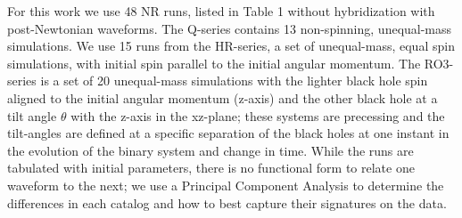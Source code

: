 \documentclass[%
 reprint,
 amsmath,amssymb,
 aps,
]{revtex4-1}
\begin{document}
For this work we use 48 NR runs, listed in Table 1 without hybridization with post-Newtonian waveforms. The Q-series contains 13 non-spinning, unequal-mass simulations. We use 15 runs from the HR-series, a set of unequal-mass, equal spin simulations, with initial spin parallel to the initial angular momentum. The RO3- series is a set of 20 unequal-mass simulations with the lighter black hole spin aligned to the initial angular momentum (z-axis) and the other black hole at a tilt angle $\theta$ with the z-axis in the xz-plane; these systems are precessing and the tilt-angles are defined at a specific separation of the black holes at one instant in the evolution of the binary system and change in time. While the runs are tabulated with initial parameters, there is no functional form to relate one waveform to the next; we use a Principal Component Analysis to determine the differences in each catalog and how to best capture their signatures on the data.
\end{document}
